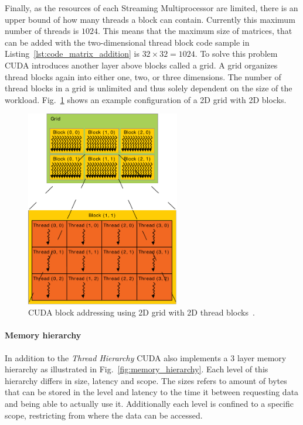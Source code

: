 Finally, as the resources of each Streaming Multiprocessor are limited, there is an upper bound of how many threads a block can contain. Currently this maximum number of threads is $1024$. This means that the maximum size of matrices, that can be added with the two-dimensional thread block code sample in Listing~\ref{lst:code_matrix_addition} is $32\times32 = 1024$. To solve this problem CUDA introduces another layer above blocks called a grid. A grid organizes thread blocks again into either one, two, or three dimensions. The number of thread blocks in a grid is unlimited and thus solely dependent on the size of the workload. Fig.~\ref{fig:grid_blocks} shows an example configuration of a 2D grid with 2D blocks.

\begin{figure}[!htbp]
  \centering
  \includegraphics[width=0.6\textwidth]{img/grid_blocks.pdf}
  \caption[CUDA block addressing using 2D grid with 2D thread blocks.]{CUDA block addressing using 2D grid with 2D thread blocks~\cite{CudaProgrammingGuide}.}
  \label{fig:grid_blocks}
\end{figure}

\paragraph{Memory hierarchy}

In addition to the \emph{Thread Hierarchy} CUDA also implements a 3 layer memory hierarchy as illustrated in Fig.~\ref{fig:memory_hierarchy}. Each level of this hierarchy differs in size, latency and scope. The sizes refers to amount of bytes that can be stored in the level and latency to the time it between requesting data and being able to actually use it. Additionally each level is confined to a specific scope, restricting from where the data can be accessed.

